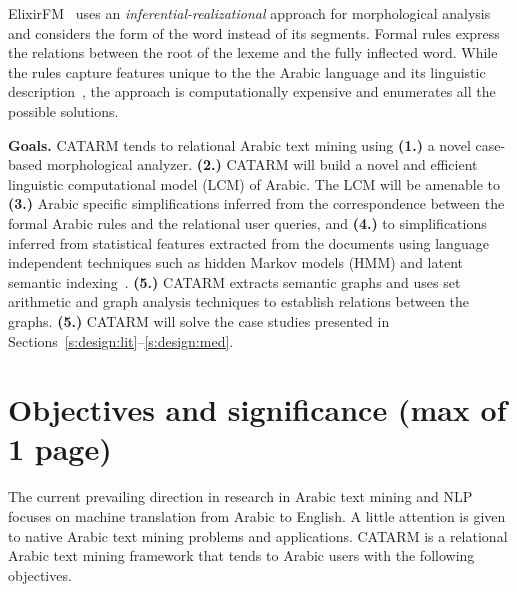 \documentclass[12pt]{article}
\newcommand{\noTrRL}[1]{\transfalse\RL{#1}\transtrue}
\begin{document}
ElixirFM~\cite{Otakar:07} uses an {\em inferential-realizational}
approach for morphological analysis
and considers the form of the word 
\noTrRL{.sarf}  instead of its segments. 
Formal rules express the relations between 
the root of the lexeme and the fully inflected word. 
While the rules capture features unique to the 
the Arabic language and its linguistic description~\cite{Badawi:04},
the approach is computationally expensive and enumerates 
all the possible solutions. 

{\bf Goals.} 
CATARM tends to relational Arabic text mining using 
{\bf (1.)} a novel case-based morphological analyzer.
{\bf (2.)} CATARM will build a novel and efficient 
linguistic computational model (LCM) of Arabic. 
The LCM will be amenable to {\bf (3.)} Arabic specific simplifications 
inferred from the correspondence between the formal Arabic rules
and the relational user queries, and 
{\bf (4.)} to simplifications 
inferred from statistical features extracted from the documents 
using language independent techniques such as 
hidden Markov models (HMM)  and 
latent semantic indexing~\cite{LSI89}.
{\bf (5.)} CATARM extracts semantic graphs 
and uses set arithmetic and graph analysis techniques
to establish relations between the graphs. {\bf (5.)} CATARM will 
solve the case studies 
presented in Sections~\ref{s:design:lit}--\ref{s:design:med}.

\pagebreak

\section{Objectives and significance (max of 1 page) } 
\label{s:objectives}

The current prevailing direction in research 
in Arabic text mining and NLP focuses on machine translation from 
Arabic to English. 
A little attention is given to native Arabic text mining 
problems and applications. 
CATARM is a relational Arabic text mining 
framework that tends to Arabic users 
with the following objectives.
\end{document}
